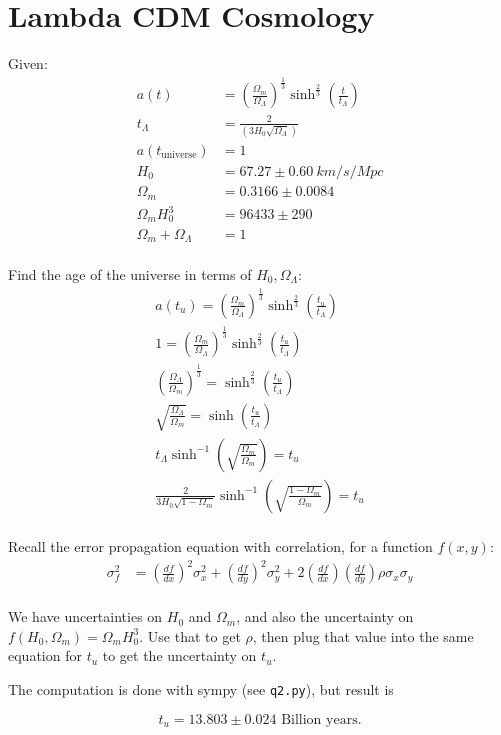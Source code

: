 \section{Lambda CDM Cosmology}
Given:
\begin{align*}
    a(t) &= \left(\frac{\Omega_m}{\Omega_\Lambda}\right)^\frac{1}{3} \sinh^{\frac{2}{3}}\left(\frac{t}{t_\Lambda}\right) \\
    t_\Lambda &= \frac{2}{\left(3H_0\sqrt{\Omega_\Lambda}\right)} \\
    a(t_{\text{universe}}) &= 1 \\
    H_0 &= 67.27 \pm \SI{0.60}{km/s/Mpc} \\
    \Omega_m &= 0.3166 \pm 0.0084 \\
    \Omega_m H_0^3 &= 96433 \pm 290 \\
    \Omega_m + \Omega_\Lambda &= 1 \\
\end{align*}

Find the age of the universe in terms of $H_0, \Omega_\Lambda$:
\begin{align*}
    a(t_u) = \left(\frac{\Omega_m}{\Omega_\Lambda}\right)^\frac{1}{3} \sinh^{\frac{2}{3}}\left(\frac{t_u}{t_\Lambda}\right)\\
    1 = \left(\frac{\Omega_m}{\Omega_\Lambda}\right)^\frac{1}{3} \sinh^{\frac{2}{3}}\left(\frac{t_u}{t_\Lambda}\right)\\
    \left(\frac{\Omega_\Lambda}{\Omega_m}\right)^\frac{1}{3} = \sinh^{\frac{2}{3}}\left(\frac{t_u}{t_\Lambda}\right)\\
    \sqrt{\frac{\Omega_\Lambda}{\Omega_m}} = \sinh\left(\frac{t_u}{t_\Lambda}\right)\\
    t_\Lambda\sinh^{-1}\left(\sqrt{\frac{\Omega_m}{\Omega_m}}\right) = t_u\\
    \frac{2}{3H_0\sqrt{1 - \Omega_m}}\sinh^{-1}\left(\sqrt{\frac{1 - \Omega_m}{\Omega_m}}\right) = t_u\\
\end{align*}

Recall the error propagation equation with correlation, for a function $f(x,y)$:
\begin{align*}
    \sigma_f^2 &= \left(\frac{df}{dx}\right)^2 \sigma_x^2 + \left(\frac{df}{dy}\right)^2 \sigma_y^2 + 2\left(\frac{df}{dx}\right)\left(\frac{df}{dy}\right)\rho \sigma_x \sigma_y \\
\end{align*}

We have uncertainties on $H_0$ and $\Omega_m$, and also the uncertainty on $f(H_0, \Omega_m) = \Omega_m H_0^3$. Use that to get $\rho$, then plug that value into the same equation for $t_u$ to get the uncertainty on $t_u$.

The computation is done with sympy (see \texttt{q2.py}), but result is

$$t_u = 13.803 \pm 0.024 \text{ Billion years.}$$
